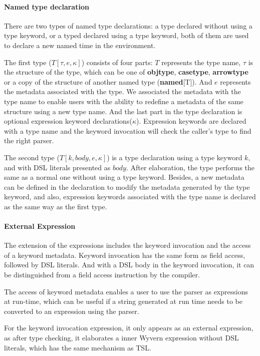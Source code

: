 \documentclass{sig-alternate}
\begin{document}
\paragraph{Named type declaration}
There are two types of named type declarations: a type declared without using a type keyword, or a typed declared using a type keyword, both of them are used to declare a new named time in the environment.

The first type ($T[\tau,e,\kappa]$) consists of four parts: $T$ represents the type name, $\tau$ is the structure of the type, which can be one of \textbf{objtype}, \textbf{casetype}, \textbf{arrowtype} or a copy of the structure of another named type (\textbf{named}[T]). And $e$ represents the metadata associated with the type. We associated the metadata with the type name to enable users with the ability to redefine a metadata of the same structure using a new type name. And the last part in the type declaration is optional expression keyword declarations($\kappa$). Expression keywords are declared with a type name and the keyword invocation will check the caller's type to find the right parser.

The second type ($T[k,body,e,\kappa]$) is a type declaration using a type keyword $k$, and with DSL literals presented as $body$. After elaboration, the type performs the same as a normal one without using a type keyword. Besides, a new metadata can be defined in the declaration to modify the metadata generated by the type keyword, and also, expression keywords associated with the type name is declared as the same way as the first type.

\paragraph{External Expression}
The extension of the expressions includes the keyword invocation and the access of a keyword metadata. Keyword invocation has the same form as field access, followed by DSL literals. And with a DSL body in the keyword invocation, it can be distinguished from a field access instruction by the compiler.

The access of keyword metadata enables a user to use the parser as expressions at run-time, which can be useful if a string generated at run time needs to be converted to an expression using the parser.

For the keyword invocation expression, it only appears as an external expression, as after type checking, it elaborates a inner Wyvern expression without DSL literals, which has the same mechanism as TSL. 
\end{document}
